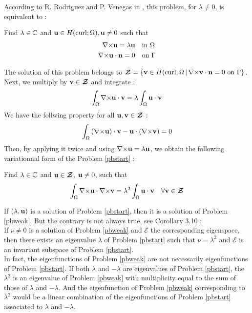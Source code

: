 According to R. Rodriguez and P. Venegas in \cite{Venegas2013}, this problem, for $\lambda\ne 0$, is
equivalent to :
\begin{pb}\label{pbcond}
Find $\lambda\in{\mathbb{C}}$ and ${\mathbf{u}}\in
  H(\mathrm{curl};\Omega),{\mathbf{u}}\ne 0$ such that
\begin{align}
{\nabla\times} {\mathbf{u}} = \lambda {\mathbf{u}} & \quad \mbox{in }\Omega\\
{\nabla\times} {\mathbf{u}}\cdot{\mathbf{n}} = 0 & \quad \mbox{on }\Gamma
\end{align}
\end{pb}
The solution of this problem belongs to ${\bm{\mathcal{Z}}}=\{{\mathbf{v}}\in
H(\mathrm{curl};\Omega \,|\, {\nabla\times}{\mathbf{v}}\cdot{\mathbf{n}}=0 \mbox{
  on } \Gamma \}$.\\

Next, we multiply by ${\mathbf{v}}\in{\bm{\mathcal{Z}}}$ and integrate :
\[ \int_\Omega {\nabla\times}{\mathbf{u}}\cdot{\mathbf{v}} = \lambda\int_\Omega
{\mathbf{u}}\cdot{\mathbf{v}} \]
We have the follwing property for all ${\mathbf{u}},{\mathbf{v}}\in{\bm{\mathcal{Z}}}$ :
\[ \int_\Omega \left({\nabla\times}{\mathbf{u}}\right)\cdot{\mathbf{v}} -
{\mathbf{u}}\cdot\left({\nabla\times}{\mathbf{v}}\right) = 0 \]
Then, by applying it twice and using
${\nabla\times}{\mathbf{u}}=\lambda{\mathbf{u}}$, we obtain the following
variationnal form of the Problem \ref{pbstart} :
\begin{pb}\label{pbweak}
Find $\lambda\in{\mathbb{C}}$ and ${\mathbf{u}}\in{\bm{\mathcal{Z}}}$, ${\mathbf{u}}\ne 0$, such
that
\[ \int_\Omega {\nabla\times}{\mathbf{u}}\cdot{\nabla\times}{\mathbf{v}} =
\lambda^2\int_\Omega {\mathbf{u}}\cdot{\mathbf{v}} \quad \forall
{\mathbf{v}}\in{\bm{\mathcal{Z}}} \]
\end{pb}

If $(\lambda,{\mathbf{u}})$ is a solution of Problem \ref{pbstart}, then it is a
solution of Problem \ref{pbweak}. But the contrary is not always true,
see \cite{Venegas2013} Corollary 3.10 :\\

If $\nu\ne 0$ is a solution of Problem \ref{pbweak} and $\bm{\mathcal{E}}$ the
corresponding eigenspace, then there exists an eigenvalue $\lambda$ of
Problem \ref{pbstart} such that $\nu=\lambda^2$ and $\bm{\mathcal{E}}$ is an
invariant subspace of Problem \ref{pbstart}.\\

In fact, the eigenfunctions of Problem \ref{pbweak} are not necessarily
eigenfunctions of Problem \ref{pbstart}. If both $\lambda$ and $-\lambda$
are eigenvalues of Problem \ref{pbstart}, the $\lambda^2$ is an eigenvalue
of Problem \ref{pbweak} with multiplicity equal to the sum of those of
$\lambda$ and $-\lambda$. And the eigenfunction of Problem \ref{pbweak}
corresponding to $\lambda^2$ would be a linear combination of the
eigenfunctions of Problem \ref{pbstart} associated to $\lambda$ and
$-\lambda$.\\

